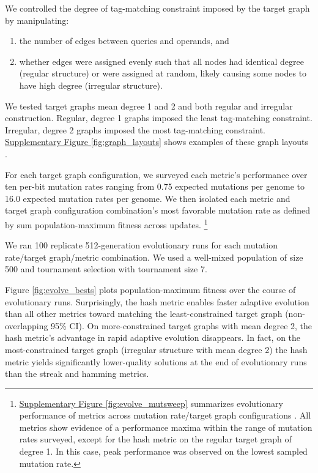 We controlled the degree of tag-matching constraint imposed by the target graph by manipulating:
\begin{enumerate}
  \item the number of edges between queries and operands, and
  \item whether edges were assigned evenly such that all nodes had identical degree (regular structure) or were assigned at random, likely causing some nodes to have high degree (irregular structure).
\end{enumerate}
We tested target graphs mean degree 1 and 2 and both regular and irregular construction.
Regular, degree 1 graphs imposed the least tag-matching constraint.
Irregular, degree 2 graphs imposed the most tag-matching constraint.
\href{doi.org/10.17605/OSF.IO/GW5MC}{Supplementary Figure \ref{fig:graph_layouts}} shows examples of these graph layouts \cite{Moreno_Ofria_2020}.

For each target graph configuration, we surveyed each metric's performance over ten per-bit mutation rates ranging from 0.75 expected mutations per genome to 16.0 expected mutation rates per genome.
We then isolated each metric and target graph configuration combination's most favorable mutation rate as defined by sum population-maximum fitness across updates.
\footnote{
\href{doi.org/10.17605/OSF.IO/GW5MC}{Supplementary Figure \ref{fig:evolve_mutsweep}} summarizes evolutionary performance of metrics across mutation rate/target graph configurations \cite{Moreno_Ofria_2020}.
All metrics show evidence of a performance maxima within the range of mutation rates surveyed, except for the hash metric on the regular target graph of degree 1.
In this case, peak performance was observed on the lowest sampled mutation rate.
}

We ran 100 replicate 512-generation evolutionary runs for each mutation rate/target graph/metric combination.
We used a well-mixed population of size 500 and tournament selection with tournament size 7.

Figure \ref{fig:evolve_bests} plots population-maximum fitness over the course of evolutionary runs.
Surprisingly, the hash metric enables faster adaptive evolution than all other metrics toward matching the least-constrained target graph (non-overlapping 95\% CI).
On more-constrained target graphs with mean degree 2, the hash metric's advantage in rapid adaptive evolution disappears.
In fact, on the most-constrained target graph (irregular structure with mean degree 2) the hash metric yields significantly lower-quality solutions at the end of evolutionary runs than the streak and hamming metrics.

